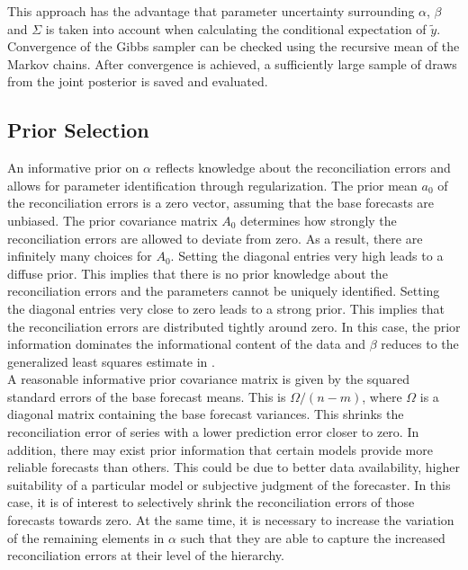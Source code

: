 \documentclass[a4paper,fleqn,11pt]{article}
\begin{document}
\noindent This approach has the advantage that parameter uncertainty surrounding $\alpha$, $\beta$ and $\Sigma$ is taken into account when calculating the conditional expectation of $\tilde y$. Convergence of the Gibbs sampler can be checked using the recursive mean of the Markov chains. After convergence is achieved, a sufficiently large sample of draws from the joint posterior is saved and evaluated.\\

\subsection{Prior Selection}
\label{subsec:prior}
An informative prior on $\alpha$ reflects knowledge about the reconciliation errors and allows for parameter identification through regularization. The prior mean $a_0$ of the reconciliation errors is a zero vector, assuming that the base forecasts are unbiased. The prior covariance matrix $A_0$ determines how strongly the reconciliation errors are allowed to deviate from zero. As a result, there are infinitely many choices for $A_0$. Setting the diagonal entries very high leads to a diffuse prior. This implies that there is no prior knowledge about the reconciliation errors and the parameters cannot be uniquely identified. Setting the diagonal entries very close to zero leads to a strong prior. This implies that the reconciliation errors are distributed tightly around zero. In this case, the prior information dominates the informational content of the data and $\beta$ reduces to the generalized least squares estimate in \cite{Hyndman2016}.\\

A reasonable informative prior covariance matrix is given by the squared standard errors of the base forecast means. This is $\Omega/(n-m)$, where $\Omega$ is a diagonal matrix containing the base forecast variances. This shrinks the reconciliation error of series with a lower prediction error closer to zero. In addition, there may exist prior information that certain models provide more reliable forecasts than others. This could be due to better data availability, higher suitability of a particular model or subjective judgment of the forecaster. In this case, it is of interest to selectively shrink the reconciliation errors of those forecasts towards zero. At the same time, it is necessary to increase the variation of the remaining elements in $\alpha$ such that they are able to capture the increased reconciliation errors at their level of the hierarchy.
\end{document}

